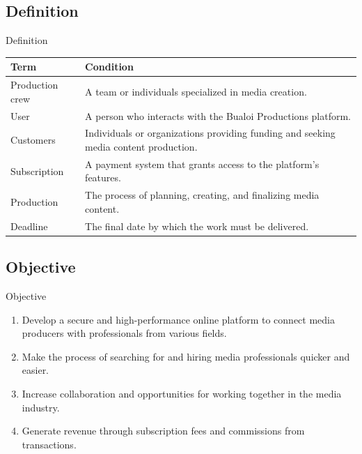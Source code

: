 \documentclass[aspectratio=169]{beamer}
\begin{document}
\subsection{Definition}
\begin{frame}{Definition}

    \begin{table}[ht]
        \centering
        \begin{tabular}{|l|p{9cm}|}
            \hline
            \textbf{Term}   & \textbf{Condition}                                                                   \\ \hline
            Production crew & A team or individuals specialized in media creation.                                 \\ \hline
            User            & A person who interacts with the Bualoi Productions platform.                         \\ \hline
            Customers       & Individuals or organizations providing funding and seeking media content production. \\ \hline
            Subscription    & A payment system that grants access to the platform's features.                      \\ \hline
            Production      & The process of planning, creating, and finalizing media content.                     \\ \hline
            Deadline        & The final date by which the work must be delivered.                                  \\ \hline
        \end{tabular}
    \end{table}
\end{frame}

\subsection{Objective}
\begin{frame}{Objective}
    \begin{enumerate}
        \item Develop a secure and high-performance online platform to connect media producers with professionals from various fields.
        \item Make the process of searching for and hiring media professionals quicker and easier.
        \item Increase collaboration and opportunities for working together in the media industry.
        \item Generate revenue through subscription fees and commissions from transactions.
    \end{enumerate}
\end{frame}
\end{document}
